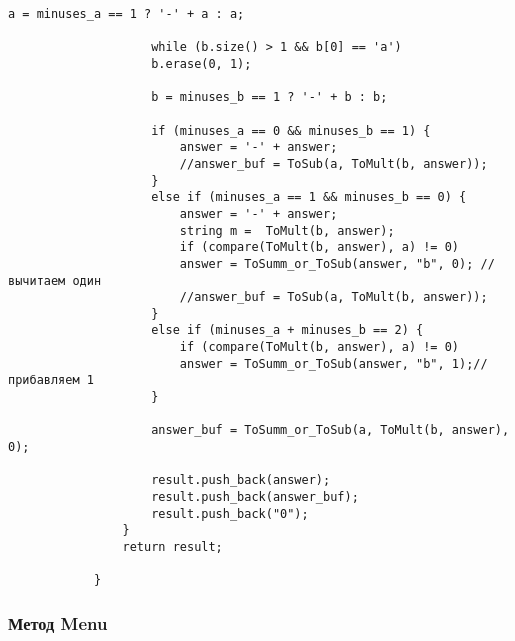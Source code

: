 \documentclass[10pt,a4paper,final]{article} %
\begin{document}
\begin{lstlisting}[caption={Метод ToDiv}]
					a = minuses_a == 1 ? '-' + a : a;
					
					while (b.size() > 1 && b[0] == 'a')
					b.erase(0, 1);
					
					b = minuses_b == 1 ? '-' + b : b;
					
					if (minuses_a == 0 && minuses_b == 1) {
						answer = '-' + answer;
						//answer_buf = ToSub(a, ToMult(b, answer));
					}
					else if (minuses_a == 1 && minuses_b == 0) {
						answer = '-' + answer;
						string m =  ToMult(b, answer);
						if (compare(ToMult(b, answer), a) != 0)
						answer = ToSumm_or_ToSub(answer, "b", 0); //вычитаем один
						//answer_buf = ToSub(a, ToMult(b, answer));
					}
					else if (minuses_a + minuses_b == 2) {
						if (compare(ToMult(b, answer), a) != 0)
						answer = ToSumm_or_ToSub(answer, "b", 1);// прибавляем 1
					}
					
					answer_buf = ToSumm_or_ToSub(a, ToMult(b, answer), 0);
					
					result.push_back(answer);
					result.push_back(answer_buf);
					result.push_back("0");
				}
				return result;
				
			}
		\end{lstlisting}
		
		
		\subsubsection{Метод Menu}
		
\end{document}
